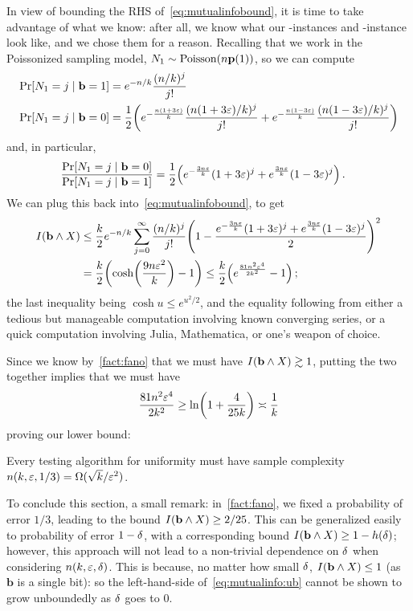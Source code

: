 In view of bounding the RHS of~\cref{eq:mutualinfobound}, it is time to take advantage of what we know: after all, we know what our \no-instances and \yes-instance look like, and we chose them for a reason. Recalling that we work in the Poissonized sampling model, $\occur_{1}\sim\poisson{\ns\p(1)}$, so we can compute
\begin{align*}
\bPr{\occur_1=j\mid \mathbf{b}=\accept }
&= e^{-\ns/\ab} \frac{(\ns/\ab)^j}{j!} \\
\bPr{\occur_1=j\mid \mathbf{b}=\reject }
&= \frac{1}{2}\Paren{ e^{-\frac{\ns(1+3\dst)}{\ab}} \frac{(\ns(1+3\dst)/\ab)^j}{j!}  + e^{-\frac{\ns(1-3\dst)}{\ab}} \frac{(\ns(1-3\dst)/\ab)^j}{j!} }
\end{align*}
and, in particular,
\begin{align}
\frac{\bPr{\occur_1=j\mid \mathbf{b}=\reject }}{\bPr{\occur_1=j\mid \mathbf{b}=\accept }}
&= \frac{1}{2}\Paren{ e^{-\frac{3\ns\dst}{\ab}} (1+3\dst)^j  + e^{\frac{3\ns\dst}{\ab}} (1-3\dst)^j}\,.
\end{align}
We can plug this back into~\cref{eq:mutualinfobound}, to get
\begin{align}
\mutualinfo{\mathbf{b}}{X}  &\leq \frac{\ab}{2} e^{-\ns/\ab}\sum_{j=0}^\infty \frac{(\ns/\ab)^j}{j!}\Paren{ 1- \frac{e^{-\frac{3\ns\dst}{\ab}} (1+3\dst)^j  + e^{\frac{3\ns\dst}{\ab}} (1-3\dst)^j}{2}}^2 \notag\\
&= \frac{\ab}{2}\Paren{\cosh\Paren{ \frac{9\ns\dst^2}{\ab} }-1} \leq \frac{\ab}{2}\Paren{ e^{\frac{81\ns^2\dst^4}{2\ab^2}}-1}\,; \label{eq:mutualinfo:ub}
\end{align}
the last inequality being $\cosh u \leq e^{u^2/2}$, and the equality following from either a tedious but manageable computation involving known converging series, or a quick computation involving Julia, Mathematica, or one's weapon of choice.

Since we know by~\cref{fact:fano} that we must have $\mutualinfo{\mathbf{b}}{X} \gtrsim 1$, putting the two together implies that we must have
\[
	\frac{81\ns^2\dst^4}{2\ab^2} \geq \ln\Paren{1+\frac{4}{25\ab}} \asymp \frac{1}{\ab}
\]
proving our lower bound:
\begin{theorem}
  \label{theo:uniformity:lb:dk16}
Every testing algorithm for uniformity must have sample complexity $n(k,\varepsilon,1/3) = \Omega(\sqrt{k}/\varepsilon^2)$.
\end{theorem}

To conclude this section, a small remark: in~\cref{fact:fano}, we fixed a probability of error $1/3$, leading to the bound $\mutualinfo{\mathbf{b}}{X} \geq 2/25$. This can be generalized easily to probability of error $1-\delta$, with a corresponding bound $\mutualinfo{\mathbf{b}}{X} \geq 1-h(\errprob)$; however, this approach will not lead to a non-trivial dependence on $\delta$ when considering $n(k,\varepsilon,\delta)$. This is because, no matter how small $\delta$, $\mutualinfo{\mathbf{b}}{X} \leq 1$  (as $\mathbf{b}$ is a single bit): so the left-hand-side of~\cref{eq:mutualinfo:ub} cannot be shown to grow unboundedly as $\delta$ goes to 0.


